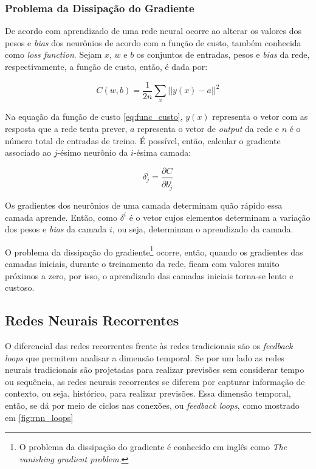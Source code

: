 \subsubsection{Problema da Dissipação do Gradiente}
\label{sec:vanishing_gradient_problem}

De acordo com \cite{neuralnetworksanddeeplearning} aprendizado de uma rede neural ocorre ao alterar os valores dos pesos
e \textit{bias} dos neurônios de acordo com a função de custo, também conhecida 
como \textit{loss function}. Sejam $x$, $w$ e $b$ os conjuntos de entradas,
pesos e \textit{bias} da rede, respectivamente, a função de custo, então, é dada por:

\begin{equation}
  C(w,b) = \frac{1}{2n}\sum_x || y(x) - a ||^2
\label{eq:func_custo}
\end{equation}

Na equação da função de custo \ref{eq:func_custo}, $y(x)$ representa o vetor com as resposta
que a rede tenta prever, $a$ representa o vetor de \textit{output} da rede e 
$n$ é o número total de entradas de treino. É possível, então, calcular o gradiente
associado ao $j$-ésimo neurônio da $i$-ésima camada:

\begin{equation}
  \delta_j^i = \frac{\partial C}{\partial b_j^i}
\label{eq:func_grad}
\end{equation}

Os gradientes dos neurônios de uma camada determinam quão rápido essa camada
aprende. Então, como $\delta^i$ é o vetor cujos elementos determinam a variação
dos pesos e \textit{bias} da camada $i$, ou seja, determinam 
o aprendizado da camada. 

O problema da dissipação do gradiente\footnote{O problema da dissipação do gradiente 
é conhecido em inglês como \textit{The vanishing gradient problem}.
} ocorre, então, quando os gradientes das camadas iniciais, durante o treinamento
da rede, ficam com valores muito próximos a zero, por isso, o aprendizado das 
camadas iniciais torna-se lento e custoso.

        
\subsection{Redes Neurais Recorrentes}
\label{rnn}

O diferencial das redes recorrentes frente às redes tradicionais são os
\textit{feedback loops} que permitem analisar a dimensão temporal.
Se por um lado as redes neurais tradicionais são projetadas
para realizar previsões sem considerar tempo ou sequência, as redes
neurais recorrentes se diferem por capturar informação de contexto, ou seja,
histórico, para realizar previsões. Essa dimensão temporal, então, se dá por 
meio de ciclos nas conexões, ou \textit{feedback loops}, como mostrado em \ref{fig:rnn_loops}

